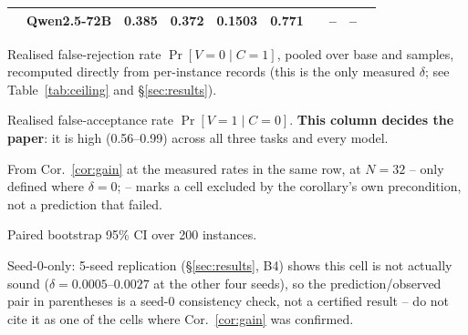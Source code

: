 \documentclass[11pt]{article}
\begin{document}
\begin{table}[t]
\begin{threeparttable}
\begin{tabular}{@{}ll cccc c cc c@{}}
  & Qwen2.5-72B   & 0.385 & 0.372 & 0.1503 & 0.771 & & {--} & {--} \\
\bottomrule
\end{tabular}
\begin{minipage}{\columnwidth}\begin{tablenotes}[flushleft]\footnotesize
\item[a] Realised false-rejection rate $\Pr[V{=}0\mid C{=}1]$, pooled over base and samples, recomputed directly from per-instance records (this is the only measured $\delta$; see Table~\ref{tab:ceiling} and \S\ref{sec:results}).
\item[b] Realised false-acceptance rate $\Pr[V{=}1\mid C{=}0]$. \textbf{This column decides the paper}: it is high (0.56--0.99) across all three tasks and every model.
\item[c] From Cor.~\ref{cor:gain} at the measured rates in the same row, at $N{=}32$ -- only defined where $\delta=0$; {--} marks a cell excluded by the corollary's own precondition, not a prediction that failed.
\item[e] Paired bootstrap 95\% CI over 200 instances.
\item[u] Seed-0-only: 5-seed replication (\S\ref{sec:results}, B4) shows this
cell is not actually sound ($\delta=0.0005$--$0.0027$ at the other four
seeds), so the prediction/observed pair in parentheses is a seed-0
consistency check, not a certified result -- do not cite it as one of the
cells where Cor.~\ref{cor:gain} was confirmed.
\end{tablenotes}\end{minipage}
\end{threeparttable}
\label{tab:params}
\end{table}
\end{document}
